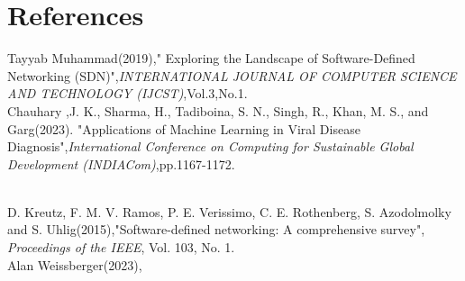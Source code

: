 \chapter*{References}

Tayyab Muhammad(2019)," Exploring the Landscape of
Software-Defined Networking (SDN)",\textit{INTERNATIONAL JOURNAL OF COMPUTER SCIENCE AND TECHNOLOGY (IJCST)},Vol.3,No.1.%
\\
\noindent
\newline
Chauhary ,J. K., Sharma, H., Tadiboina, S. N., Singh, R., Khan, M. S., and Garg(2023). "Applications of Machine Learning in Viral Disease Diagnosis",\textit{International Conference on Computing for Sustainable Global Development
(INDIACom)},pp.1167-1172.%

\\
\noindent
\newline
D. Kreutz, F. M. V. Ramos, P. E. Verissimo, C. E. Rothenberg, S. Azodolmolky and S. Uhlig(2015),"Software-defined networking: A comprehensive survey", \textit{Proceedings of the IEEE}, Vol. 103, No. 1.
\\
\noindent
\newline
Alan Weissberger(2023),
